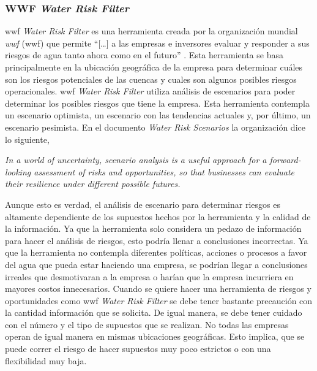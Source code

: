 \subsubsection{WWF \textit{Water Risk Filter}} \label{subsubsec:wwf-water-risk-filter}
\acrshort{wwf} \textit{Water Risk Filter} es una herramienta creada por la organización mundial \textit{\acrlong{wwf}} (\acrshort{wwf}) que permite  “[…] a las empresas e inversores evaluar y responder a sus riesgos de agua tanto ahora como en el futuro” \parencite{world-wildlife-fund-2023}. Esta herramienta se basa principalmente en la ubicación geográfica de la empresa para determinar cuáles son los riesgos potenciales de las cuencas y cuales son algunos posibles riesgos operacionales. \acrshort{wwf} \textit{Water Risk Filter} utiliza análisis de escenarios para poder determinar los posibles riesgos que tiene la empresa. Esta herramienta contempla un escenario optimista, un escenario con las tendencias actuales y, por último, un escenario pesimista. En el documento \textit{Water Risk Scenarios} \parencite{world-wildlife-fund-2020} la organización dice lo siguiente,


\hfill
\par
\leftskip=0.35in \rightskip=0.35in
\textit{In a world of uncertainty, scenario analysis is a useful approach for a forward-looking assessment of risks and opportunities, so that businesses can evaluate their resilience under different possible futures.}

\hfill
\par
\leftskip=0in \rightskip=0in

Aunque esto es verdad, el análisis de escenario para determinar riesgos es altamente dependiente de los supuestos hechos por la herramienta y la calidad de la información. Ya que la herramienta solo considera un pedazo de información para hacer el análisis de riesgos, esto podría llenar a conclusiones incorrectas. Ya que la herramienta no contempla diferentes políticas, acciones o procesos a favor del agua que pueda estar haciendo una empresa, se podrían llegar a conclusiones irreales que desmotivaran a la empresa o harían que la empresa incurriera en mayores costos innecesarios. Cuando se quiere hacer una herramienta de riesgos y oportunidades como  \acrshort{wwf} \textit{Water Risk Filter} se debe tener bastante precaución con la cantidad información que se solicita. De igual manera, se debe tener cuidado con el número y el tipo de supuestos que se realizan. No todas las empresas operan de igual manera en mismas ubicaciones geográficas. Esto implica, que se puede correr el riesgo de hacer supuestos muy poco estrictos o con una flexibilidad muy baja.



